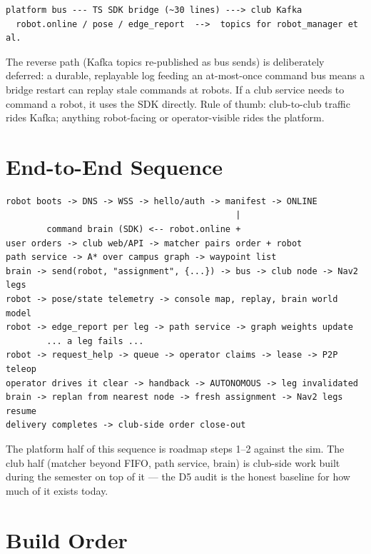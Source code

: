 \documentclass[11pt]{article}
\begin{document}
\begin{lstlisting}
platform bus --- TS SDK bridge (~30 lines) ---> club Kafka
  robot.online / pose / edge_report  -->  topics for robot_manager et al.
\end{lstlisting}

The reverse path (Kafka topics re-published as bus sends) is deliberately deferred: a
durable, replayable log feeding an at-most-once command bus means a bridge restart
can replay stale commands at robots. If a club service needs to command a robot, it
uses the SDK directly. Rule of thumb: club-to-club traffic rides Kafka; anything
robot-facing or operator-visible rides the platform.

\section{End-to-End Sequence}

\begin{lstlisting}
robot boots -> DNS -> WSS -> hello/auth -> manifest -> ONLINE
                                             |
        command brain (SDK) <-- robot.online +
user orders -> club web/API -> matcher pairs order + robot
path service -> A* over campus graph -> waypoint list
brain -> send(robot, "assignment", {...}) -> bus -> club node -> Nav2 legs
robot -> pose/state telemetry -> console map, replay, brain world model
robot -> edge_report per leg -> path service -> graph weights update
        ... a leg fails ...
robot -> request_help -> queue -> operator claims -> lease -> P2P teleop
operator drives it clear -> handback -> AUTONOMOUS -> leg invalidated
brain -> replan from nearest node -> fresh assignment -> Nav2 legs resume
delivery completes -> club-side order close-out
\end{lstlisting}

The platform half of this sequence is roadmap steps 1--2 against the sim. The club
half (matcher beyond FIFO, path service, brain) is club-side work built during the
semester on top of it --- the D5 audit is the honest baseline for how much of it
exists today.

\section{Build Order}
\end{document}

